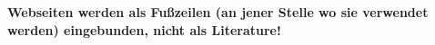\documentclass[paper=A4, deutsch]{scrartcl}
\begin{document}


\textbf{Webseiten werden als Fußzeilen (an jener Stelle wo sie verwendet werden) eingebunden, nicht als Literature!}
\end{document}
